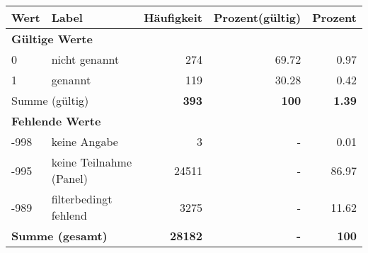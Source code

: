      \begin{longtable}{lXrrr}
     \toprule
     \textbf{Wert} & \textbf{Label} & \textbf{Häufigkeit} & \textbf{Prozent(gültig)} & \textbf{Prozent} \\
     \endhead
     \midrule
     \multicolumn{5}{l}{\textbf{Gültige Werte}}\\

     0 &
     \multicolumn{1}{X}{ nicht genannt   } &


       \num{274} &
       \num[round-mode=places,round-precision=2]{69.72} &
         \num[round-mode=places,round-precision=2]{0.97} \\

     1 &
     \multicolumn{1}{X}{ genannt   } &


       \num{119} &
       \num[round-mode=places,round-precision=2]{30.28} &
         \num[round-mode=places,round-precision=2]{0.42} \\
     \midrule
     \multicolumn{2}{l}{Summe (gültig)} &
       \textbf{\num{393}} &
     \textbf{\num{100}} &
       \textbf{\num[round-mode=places,round-precision=2]{1.39}} \\
     \multicolumn{5}{l}{\textbf{Fehlende Werte}}\\
       -998 &
       keine Angabe &
         \num{3} &
        - &
         \num[round-mode=places,round-precision=2]{0.01} \\
       -995 &
       keine Teilnahme (Panel) &
         \num{24511} &
        - &
         \num[round-mode=places,round-precision=2]{86.97} \\
       -989 &
       filterbedingt fehlend &
         \num{3275} &
        - &
         \num[round-mode=places,round-precision=2]{11.62} \\
     \midrule
     \multicolumn{2}{l}{\textbf{Summe (gesamt)}} &
          \textbf{\num{28182}} &
        \textbf{-} &
        \textbf{\num{100}} \\
     \bottomrule
     \end{longtable}
     

